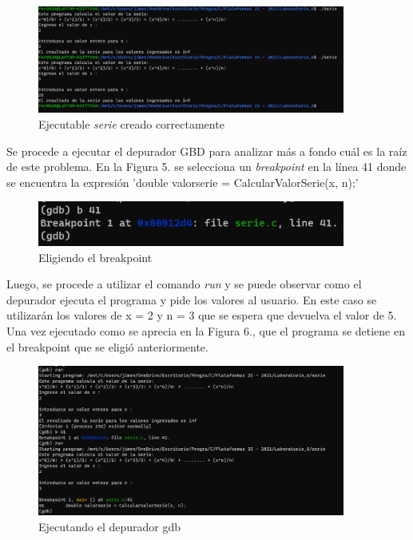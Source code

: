 \documentclass[12pt,a4paper]{article}
\begin{document}
\begin{figure}[H]
    \centering
    \center
    \includegraphics[width=0.9\textwidth]{Fotos_Lab6/Figura4.png}
    \caption{Ejecutable \textit{serie} creado correctamente}
    \label{1}
\end{figure}

Se procede a ejecutar el depurador GBD para analizar más a fondo cuál es la raíz de este problema. En la Figura 5. se selecciona un \textit{breakpoint} en la línea 41 donde se encuentra la expresión 'double valorserie = CalcularValorSerie(x, n);' 

\begin{figure}[H]
    \centering
    \center
    \includegraphics[width=0.9\textwidth]{Fotos_Lab6/Figura5.png}
    \caption{Eligiendo el breakpoint}
    \label{1}
\end{figure}

Luego, se procede a utilizar el comando \textit{run} y se puede observar como el depurador ejecuta el programa y pide los valores al usuario. En este caso se utilizarán los valores de x = 2 y n = 3 que se espera que devuelva el valor de 5. Una vez ejecutado como se aprecia en la Figura 6., que el programa se detiene en el breakpoint que se eligió anteriormente.

\begin{figure}[H]
    \centering
    \center
    \includegraphics[width=0.9\textwidth]{Fotos_Lab6/Figura6.png}
    \caption{Ejecutando el depurador gdb}
    \label{1}
\end{figure}
\end{document}
